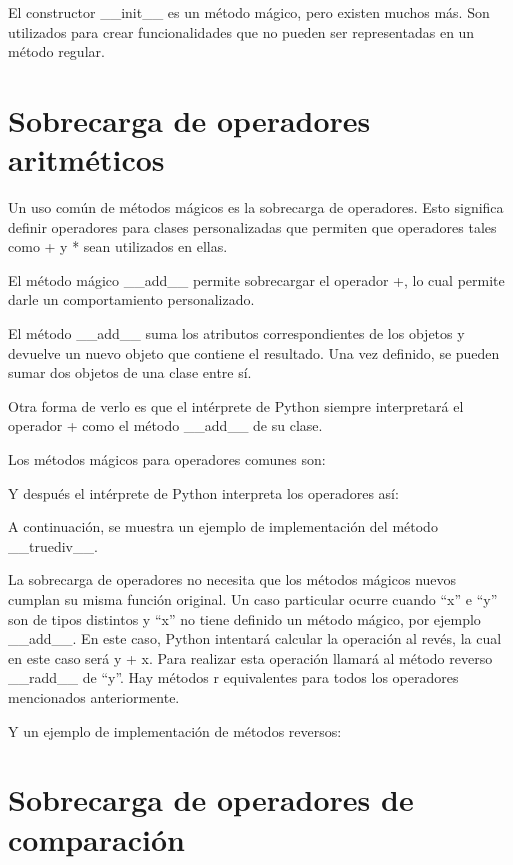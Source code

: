 \documentclass{report}
\newcommand{\doble}[1]{``#1''}
\begin{document}
El constructor \_\_init\_\_ es un método mágico, pero existen muchos más. Son utilizados para crear funcionalidades que no pueden ser representadas en un método regular.

\section{Sobrecarga de operadores aritméticos}

Un uso común de métodos mágicos es la sobrecarga de operadores. Esto significa definir operadores para clases personalizadas que permiten que operadores tales como + y * sean utilizados en ellas.

El método mágico \_\_add\_\_ permite sobrecargar el operador +, lo cual permite darle un comportamiento personalizado.


El método \_\_add\_\_ suma los atributos correspondientes de los objetos y devuelve un nuevo objeto que contiene el resultado. Una vez definido, se pueden sumar dos objetos de una clase entre sí.

Otra forma de verlo es que el intérprete de Python siempre interpretará el operador + como el método \_\_add\_\_ de su clase.

Los métodos mágicos para operadores comunes son:


Y después el intérprete de Python interpreta los operadores así:


A continuación, se muestra un ejemplo de implementación del método \_\_truediv\_\_.


La sobrecarga de operadores no necesita que los métodos mágicos nuevos cumplan su misma función original.
Un caso particular ocurre cuando \doble{x} e \doble{y} son de tipos distintos y \doble{x} no tiene definido un método mágico, por ejemplo \_\_add\_\_. En este caso, Python intentará calcular la operación al revés, la cual en este caso será y + x. Para realizar esta operación llamará al método reverso \_\_radd\_\_ de “y”.
Hay métodos r equivalentes para todos los operadores mencionados anteriormente.


Y un ejemplo de implementación de métodos reversos:


\section{Sobrecarga de operadores de comparación}
\end{document}
